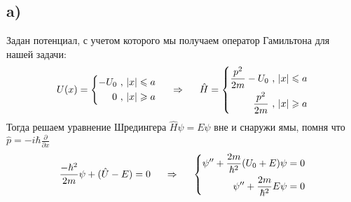 \subsection*{a)}
Задан потенциал, с учетом которого мы получаем оператор Гамильтона для нашей задачи:
\begin{equation*}
	U(x) = \left\{\begin{aligned}
		-U_0 \ , \ &|x| \leq a \\
		0 \ , \ &|x| \geq a
	\end{aligned}
	\right.
	\hspace{0.5 cm}
	\Rightarrow
	\hspace{0.5 cm}
	\hat{H} = \left\{\begin{aligned}
		\frac{p^2}{2m} - U_0 \ , \ &|x| \leq a \\
		\frac{p^2}{2m} \ , \ &|x| \geq a	
	\end{aligned}
	\right.
\end{equation*}
Тогда решаем уравнение Шредингера $\hat{H} \psi = E \psi$ вне и снаружи ямы, помня что $\hat{p} = - i \hbar \frac{\partial}{\partial x}$
\begin{equation*}
\frac{- \hbar^2}{2 m} \psi + (\hat{U} - E) = 0
\hspace{0.5 cm}
\Rightarrow
\hspace{0.5 cm}
\left\{\begin{aligned}
	\psi'' + \frac{2 m}{\hbar^2}(U_0 + E) \psi = 0 \\
	\psi'' + \frac{2 m}{\hbar^2} E \psi = 0
\end{aligned}\right.
\end{equation*}